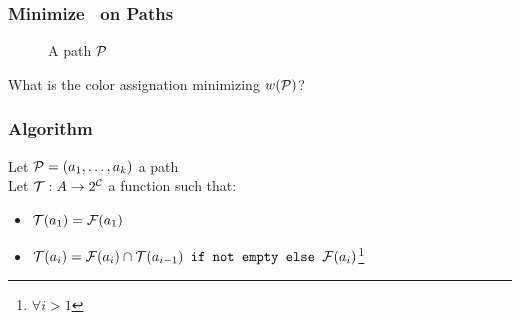 \begin{frame}
  \frametitle{Minimize \ on Paths}

  \begin{figure}[!htb]
    \caption{A path $\mathcal{P}$}
  \end{figure}


  What is the color assignation minimizing $w(\mathcal{P})$?

\end{frame}

\begin{frame}
  \frametitle{Algorithm}

  Let $\mathcal{P}=(a_1,\ldots,a_{k})$ a path\\
  Let $\mathcal{T}: A \rightarrow 2^{\mathcal{C}}$ a function such that:

  \begin{itemize}
    \item $\mathcal{T}(a_1) = \mathcal{F}(a_1)$
    \item $\mathcal{T}(a_i) = \mathcal{F}(a_i) \cap \mathcal{T}(a_{i-1}) \texttt{ if not empty else } \mathcal{F}(a_i)$\footnote{$\forall i > 1$}
  \end{itemize}

  \mysep{}

\end{frame}

